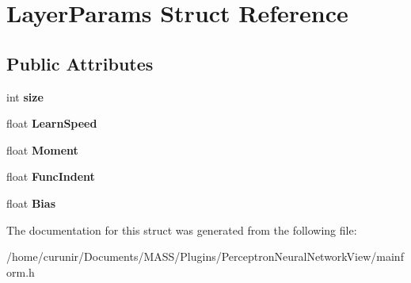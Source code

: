 \hypertarget{struct_layer_params}{}\section{Layer\+Params Struct Reference}
\label{struct_layer_params}
\subsection*{Public Attributes}
\begin{DoxyCompactItemize}
\item 
int {\bfseries size}\hypertarget{struct_layer_params_a2e54d0a4d2d5b21b74f3fe1201edf496}{}\label{struct_layer_params_a2e54d0a4d2d5b21b74f3fe1201edf496}

\item 
float {\bfseries Learn\+Speed}\hypertarget{struct_layer_params_a1461967bf879d4aa8eedcbd8557578ae}{}\label{struct_layer_params_a1461967bf879d4aa8eedcbd8557578ae}

\item 
float {\bfseries Moment}\hypertarget{struct_layer_params_a8519674bc4f1a5aca12a75f2a64883fc}{}\label{struct_layer_params_a8519674bc4f1a5aca12a75f2a64883fc}

\item 
float {\bfseries Func\+Indent}\hypertarget{struct_layer_params_aae57514ee2e26631a5117c4e51bfcc11}{}\label{struct_layer_params_aae57514ee2e26631a5117c4e51bfcc11}

\item 
float {\bfseries Bias}\hypertarget{struct_layer_params_a91105a7a6bbd8a8c6c4b60cb105f0008}{}\label{struct_layer_params_a91105a7a6bbd8a8c6c4b60cb105f0008}

\end{DoxyCompactItemize}


The documentation for this struct was generated from the following file\+:\begin{DoxyCompactItemize}
\item 
/home/curunir/\+Documents/\+M\+A\+S\+S/\+Plugins/\+Perceptron\+Neural\+Network\+View/mainform.\+h\end{DoxyCompactItemize}
